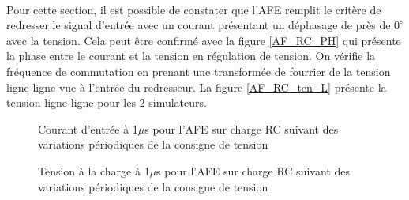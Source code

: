 \paragraph{}Pour cette section, il est possible de constater que l'AFE remplit le critère de redresser le signal d'entrée avec un courant présentant un déphasage de près de $0^\circ$ avec la tension. Cela peut être confirmé avec la figure \ref{AF_RC_PH} qui présente la phase entre le courant et la tension en régulation de tension. On vérifie la fréquence de commutation en prenant une transformée de fourrier de la tension ligne-ligne vue à l'entrée du redresseur. La figure \ref{AF_RC_ten_L} présente la tension ligne-ligne pour les 2 simulateurs.

\begin{figure}[htb]
\centering
{}
\caption{Courant d'entrée à 1$\mu$s pour l'AFE sur charge RC suivant des variations périodiques de la consigne de tension}
\label{AF_RC_cou}
\end{figure}




\begin{figure}[htb]
\centering
{}
\caption{Tension à la charge à 1$\mu$s pour l'AFE sur charge RC suivant des variations périodiques de la consigne de tension}
\label{AF_RC_ten}
\end{figure}




